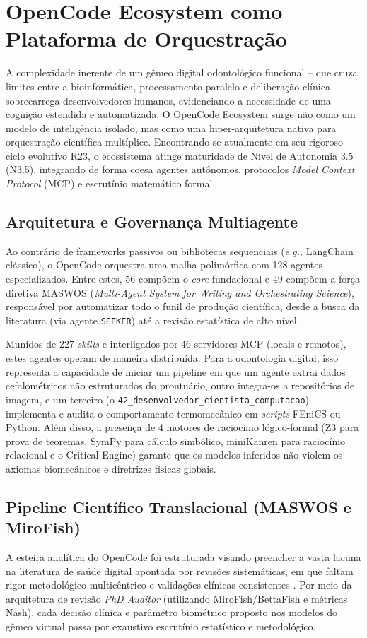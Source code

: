 \section{OpenCode Ecosystem como Plataforma de Orquestração}

A complexidade inerente de um gêmeo digital odontológico funcional -- que cruza limites entre a bioinformática, processamento paralelo e deliberação clínica -- sobrecarrega desenvolvedores humanos, evidenciando a necessidade de uma cognição estendida e automatizada. O OpenCode Ecosystem \cite{opencode2026ecosystem} surge não como um modelo de inteligência isolado, mas como uma hiper-arquitetura nativa para orquestração científica multíplice. Encontrando-se atualmente em seu rigoroso ciclo evolutivo R23, o ecossistema atinge maturidade de Nível de Autonomia 3.5 (N3.5), integrando de forma coesa agentes autônomos, protocolos \textit{Model Context Protocol} (MCP) e escrutínio matemático formal.

\subsection{Arquitetura e Governança Multiagente}
Ao contrário de frameworks passivos ou bibliotecas sequenciais (\textit{e.g.}, LangChain clássico), o OpenCode orquestra uma malha polimórfica com 128 agentes especializados. Entre estes, 56 compõem o \textit{core} fundacional e 49 compõem a força diretiva MASWOS (\textit{Multi-Agent System for Writing and Orchestrating Science}), responsável por automatizar todo o funil de produção científica, desde a busca da literatura (via agente \texttt{SEEKER}) até a revisão estatística de alto nível.

Munidos de 227 \textit{skills} e interligados por 46 servidores MCP (locais e remotos), estes agentes operam de maneira distribuída. Para a odontologia digital, isso representa a capacidade de iniciar um pipeline em que um agente extrai dados cefalométricos não estruturados do prontuário, outro integra-os a repositórios de imagem, e um terceiro (o \texttt{42\_desenvolvedor\_cientista\_computacao}) implementa e audita o comportamento termomecânico em \textit{scripts} FEniCS ou Python. Além disso, a presença de 4 motores de raciocínio lógico-formal (Z3 para prova de teoremas, SymPy para cálculo simbólico, miniKanren para raciocínio relacional e o Critical Engine) garante que os modelos inferidos não violem os axiomas biomecânicos e diretrizes físicas globais.

\subsection{Pipeline Científico Translacional (MASWOS e MiroFish)}
A esteira analítica do OpenCode foi estruturada visando preencher a vasta lacuna na literatura de saúde digital apontada por revisões sistemáticas, em que faltam rigor metodológico multicêntrico e validações clínicas consistentes \cite{duggal2026exploring, shen2024effectiveness}. Por meio da arquitetura de revisão \textit{PhD Auditor} (utilizando MiroFish/BettaFish e métricas Nash), cada decisão clínica e parâmetro biométrico proposto nos modelos do gêmeo virtual passa por exaustivo escrutínio estatístico e metodológico.

